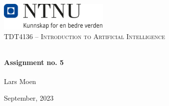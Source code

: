 \begin{titlepage}
\vbox{ }
\vbox{ }
\begin{center}
\includegraphics[width=0.40\textwidth]{Images/NTNU_logo.png}\\[1cm]
\textsc{\Large TDT4136 – Introduction to Artificial Intelligence}\\[0.5cm]
\vbox{ }

\HRule \\[0.4cm]
{ \huge \bfseries Assignment no. 5}\\[0.4cm]
\HRule \\[1.5cm]

\large
Lars Moen
\vfill

{\large September, 2023}
\end{center}
\end{titlepage}
